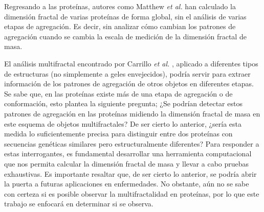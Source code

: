 Regresando a las prote\'{i}nas, autores como Matthew \textit{et al.} \cite{Enright2005} han calculado la dimensi\'{o}n fractal de varias 
prote\'{i}nas de forma global, sin el an\'{a}lisis de varias etapas de agregaci\'{o}n. Es decir, sin analizar c\'{o}mo cambian los patrones 
de agregaci\'{o}n cuando se cambia la escala de medici\'{o}n de la dimensi\'{o}n fractal de masa.

El an\'{a}lisis multifractal encontrado por Carrillo \textit{et al.} \cite{Carrillo2003}, aplicado a diferentes tipos de estructuras 
(no simplemente a geles envejecidos), podr\'{i}a servir para extraer informaci\'{o}n de los patrones de agregaci\'{o}n de otros objetos 
en diferentes etapas. Se sabe que, en las prote\'{i}nas existe m\'{a}s de una etapa de agregaci\'{o}n o de conformaci\'{o}n, esto plantea 
la siguiente pregunta; ¿Se podr\'{i}an detectar estos patrones de agregaci\'{o}n en las prote\'{i}nas midiendo la dimensi\'{o}n fractal de 
masa en este esquema de objetos multifractales? De ser cierto lo anterior, ¿ser\'{i}a esta medida lo suficientemente precisa para distinguir 
entre dos prote\'{i}nas con secuencias gen\'{e}ticas similares pero estructuralmente diferentes? Para responder a estas interrogantes, es 
fundamental desarrollar una herramienta computacional que nos permita calcular la dimensi\'{o}n fractal de masa y llevar a cabo pruebas 
exhaustivas. Es importante resaltar que, de ser cierto lo anterior, se podr\'{i}a abrir la puerta a futuras aplicaciones en enfermedades. 
No obstante, a\'{u}n no se sabe con certeza si es posible observar la multifractalidad en prote\'{i}nas, por lo que este trabajo 
se enfocar\'{a} en determinar si se observa.








